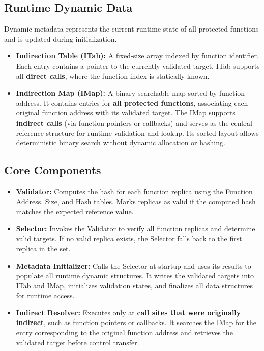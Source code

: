 \subsection{Runtime Dynamic Data}
Dynamic metadata represents the current runtime state of all protected functions and is
updated during initialization.

\begin{itemize}
  \item \textbf{Indirection Table (ITab):}
        A fixed-size array indexed by function identifier.
        Each entry contains a pointer to the currently validated target.
        ITab supports all \textbf{direct calls}, where the function index is statically known.
  \item \textbf{Indirection Map (IMap):}
        A binary-searchable map sorted by function address.
        It contains entries for \textbf{all protected functions}, associating each original
        function address with its validated target.
        The IMap supports \textbf{indirect calls} (via function pointers or callbacks)
        and serves as the central reference structure for runtime validation and lookup.
        Its sorted layout allows deterministic binary search without dynamic allocation or hashing.
\end{itemize}

\subsection{Core Components}
\begin{itemize}
  \item \textbf{Validator:}
        Computes the hash for each function replica using the Function Address, Size, and Hash tables.
        Marks replicas as valid if the computed hash matches the expected reference value.

  \item \textbf{Selector:}
        Invokes the Validator to verify all function replicas and determine valid targets.
        If no valid replica exists, the Selector falls back to the first replica in the set.

  \item \textbf{Metadata Initializer:}
        Calls the Selector at startup and uses its results to populate all runtime dynamic structures.
        It writes the validated targets into ITab and IMap, initializes validation states,
        and finalizes all data structures for runtime access.

  \item \textbf{Indirect Resolver:}
        Executes only at \textbf{call sites that were originally indirect}, such as function pointers
        or callbacks. It searches the IMap for the entry corresponding to the original function
        address and retrieves the validated target before control transfer.
\end{itemize}

